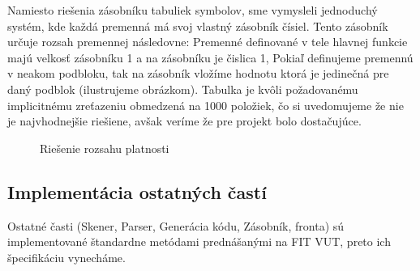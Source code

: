 \documentclass[Slovak, a4paper, 12pt]{article}
\begin{document}
	 Namiesto riešenia zásobníku tabuliek symbolov, sme vymysleli jednoduchý systém, kde každá premenná má svoj vlastný zásobník čísiel. Tento zásobník určuje 
	 rozsah premennej následovne: Premenné definované v tele hlavnej funkcie majú velkosť zásobníku 1 a na zásobníku je čislica 1, Pokiaľ definujeme premennú v neakom podbloku, tak na zásobník vložíme hodnotu ktorá je jedinečná pre daný podblok (ilustrujeme obrázkom). Tabulka je kvôli požadovanému implicitnému
	 zreťazeniu obmedzená na 1000 položiek, čo si uvedomujeme že nie je najvhodnejšie riešiene, avšak veríme že pre projekt bolo dostačujúce. 
	 \\
	\begin{figure}[ht]
		\begin{center}
			\caption{Riešenie rozsahu platnosti}
		\end{center}
	\end{figure}
	\newpage

	\subsection{Implementácia ostatných častí}
	Ostatné časti (Skener, Parser, Generácia kódu, Zásobník, fronta) sú implementované štandardne metódami prednášanými na FIT VUT, preto ich špecifikáciu
	vynecháme.  
	
\end{document}
